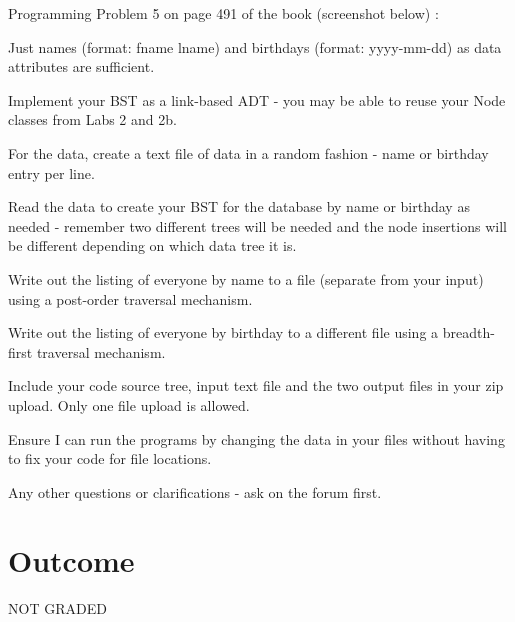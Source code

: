Programming Problem 5 on page 491 of the book (screenshot below) \+:


\begin{DoxyItemize}
\item Just names (format\+: fname lname) and birthdays (format\+: yyyy-\/mm-\/dd) as data attributes are sufficient.
\item Implement your B\+ST as a link-\/based A\+DT -\/ you may be able to reuse your Node classes from Labs 2 and 2b.
\item For the data, create a text file of data in a random fashion -\/ name or birthday entry per line.
\item Read the data to create your B\+ST for the database by name or birthday as needed -\/ remember two different trees will be needed and the node insertions will be different depending on which data tree it is.
\item Write out the listing of everyone by name to a file (separate from your input) using a post-\/order traversal mechanism.
\item Write out the listing of everyone by birthday to a different file using a breadth-\/first traversal mechanism.
\item Include your code source tree, input text file and the two output files in your zip upload. Only one file upload is allowed.
\item Ensure I can run the programs by changing the data in your files without having to fix your code for file locations.
\end{DoxyItemize}

Any other questions or clarifications -\/ ask on the forum first.

\section*{Outcome}

N\+OT G\+R\+A\+D\+ED 